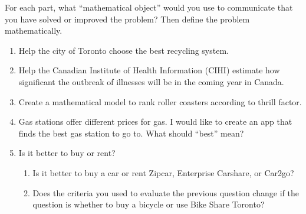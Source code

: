 \begin{exercises}
	\begin{problist}
		\prob
		\label{object}
		For each part, what ``mathematical object'' would you use to communicate that you have solved or improved the problem? Then define the problem mathematically.
		\begin{enumerate}
			\item Help the city of Toronto choose the best recycling system.
			\item Help the Canadian Institute of Health Information (CIHI) estimate how significant the outbreak of illnesses will be in the coming year in Canada.
			\item Create a mathematical model to rank roller coasters according to thrill factor.
			\item Gas stations offer different prices for gas. I would like to create an app that finds the best gas station to go to. What should ``best'' mean?
			\item Is it better to buy or rent? 
			\begin{enumerate}
				\item Is it better to buy a car or rent Zipcar, Enterprise Carshare, or Car2go?
				\item Does the criteria you used to evaluate the previous question change if the question is whether to buy a bicycle or use Bike Share Toronto? 
			\end{enumerate}
		\end{enumerate}

		
	\end{problist}
\end{exercises}
